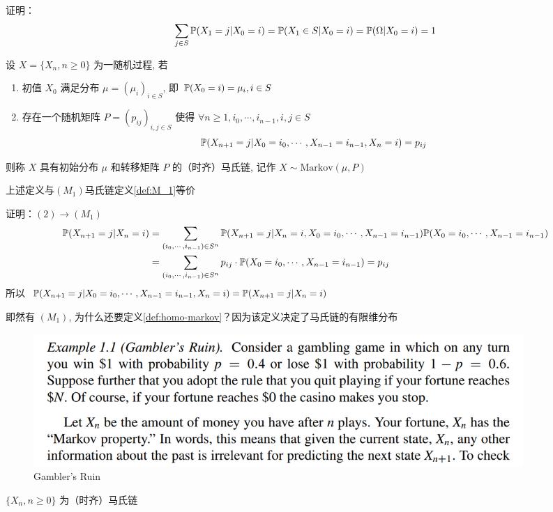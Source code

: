 证明：
\[
\sum_{j\in S}\mathbb{P}(X_1=j|X_0=i)=\mathbb{P}(X_1\in S|X_0=i)=\mathbb{P}(\Omega|X_0=i)=1
\]

\begin{definition}[时齐马氏链]\label{def:homo-markov}
    设 $X=\{X_n,n\geq 0\}$ 为一随机过程, 若
    \begin{enumerate}
        \item 初值 $X_0$ 满足分布 $\mu=(\mu_i)_{i\in S}$, 即 $\mathbb{P}(X_0=i)=\mu_i,i\in S$
        \item 存在一个随机矩阵 $P=(p_{ij})_{i,j\in S}$ 使得 $\forall n\geq 1,i_0,\cdots,i_{n-1},i,j\in S$
        \[
        \mathbb{P}(X_{n+1}=j|X_0=i_0,\cdots,X_{n-1}=i_{n-1},X_n=i)=p_{ij}
        \]
    \end{enumerate}
    则称 $X$ 具有初始分布 $\mu$ 和转移矩阵 $P$ 的（时齐）马氏链, 记作 $X\sim \text{Markov}(\mu,P)$
\end{definition}

上述定义与$(M_1)$马氏链定义\ref{def:M_1}等价

证明：$(2)\rightarrow (M_1)$
\[
\begin{aligned}
    \mathbb{P}(X_{n+1}=j|X_n=i)&=\sum_{(i_0,\cdots,i_{n-1})\in S^n}\mathbb{P}(X_{n+1}=j|X_n=i,X_0=i_0,\cdots,X_{n-1}=i_{n-1})\mathbb{P}(X_0=i_0,\cdots,X_{n-1}=i_{n-1})\\
    &=\sum_{(i_0,\cdots,i_{n-1})\in S^n}p_{ij}\cdot \mathbb{P}(X_0=i_0,\cdots,X_{n-1}=i_{n-1})=p_{ij}
\end{aligned}
\]
所以 $\mathbb{P}(X_{n+1}=j|X_0=i_0,\cdots,X_{n-1}=i_{n-1},X_n=i)=\mathbb{P}(X_{n+1}=j|X_n=i)$

即然有 $(M_1)$, 为什么还要定义\ref{def:homo-markov}？因为该定义决定了马氏链的有限维分布

\begin{example} 
    \begin{figure}[H]
        \centering
        \includegraphics[width=0.9\textwidth]{figures/Gambler's Ruin.png}
        \caption{Gambler's Ruin}
    \end{figure}
\end{example}

\begin{claim}
$\{X_n,n\geq 0\}$ 为（时齐）马氏链
\end{claim}

